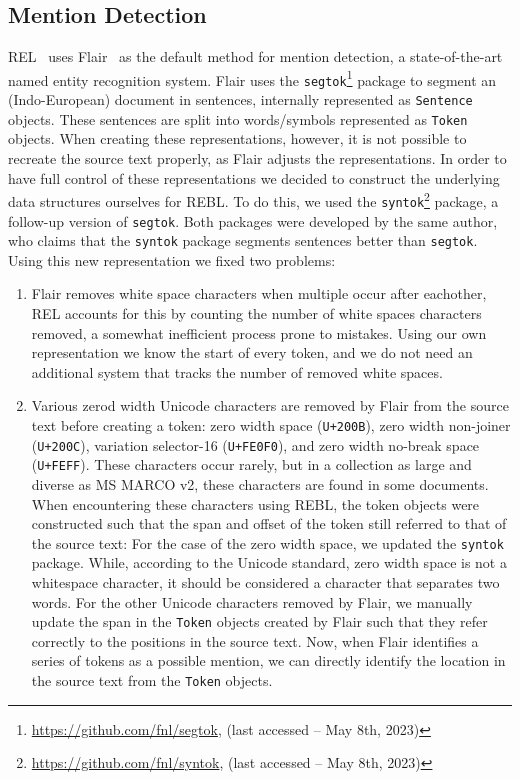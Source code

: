 \subsection{Mention Detection}
REL~\citep{rel} uses Flair~\citep{flair} as the default method for mention detection, a state-of-the-art named entity recognition system. Flair uses the \texttt{segtok}\footnote{\url{https://github.com/fnl/segtok}, (last accessed -- May 8th, 2023)} package to segment an (Indo-European) document in sentences, internally represented as \texttt{Sentence} objects. These sentences are split into words/symbols represented as \texttt{Token} objects.
When creating these representations, however, it is not possible to recreate the source text properly, as 
Flair adjusts the representations. In order to have full control of these representations we decided to  construct the underlying data structures ourselves for REBL. To do this, we used the \texttt{syntok}\footnote{\url{https://github.com/fnl/syntok}, (last accessed -- May 8th, 2023)} package, a follow-up version of \texttt{segtok}.
Both packages were developed by the same author, who claims that the \texttt{syntok} package segments sentences better than \texttt{segtok}. 
Using this new representation we fixed two problems: 
\begin{enumerate}
	\item Flair removes white space characters when multiple occur after eachother, REL accounts for this by counting the number of white spaces characters removed, a somewhat inefficient process prone to mistakes. Using our own representation we know the start of every token, and we do not need an additional system that tracks the number of removed white spaces. 
	\item Various zerod width Unicode characters are removed by Flair from the source text before creating a token: zero width space (\texttt{U+200B}), zero width non-joiner (\texttt{U+200C}), variation selector-16 (\texttt{U+FE0F0}), and zero width no-break space (\texttt{U+FEFF}). 
	These characters occur rarely, but in a collection as large and diverse as MS MARCO v2, these characters are found in some documents. When encountering these characters using REBL, the token objects were constructed such that the span and offset of the token still referred to that of the source text:
	For the case of the zero width space, we updated the \texttt{syntok} package. While, according to the Unicode standard, zero width space is not a whitespace character, it should be considered a character that separates two words. For the other Unicode characters removed by Flair, we manually update the span in the \texttt{Token} objects created by Flair such that they refer correctly to the positions in the source text. Now, when Flair identifies a series of tokens as a possible mention, we can directly identify the location in the source text from the \texttt{Token} objects.
\end{enumerate}

